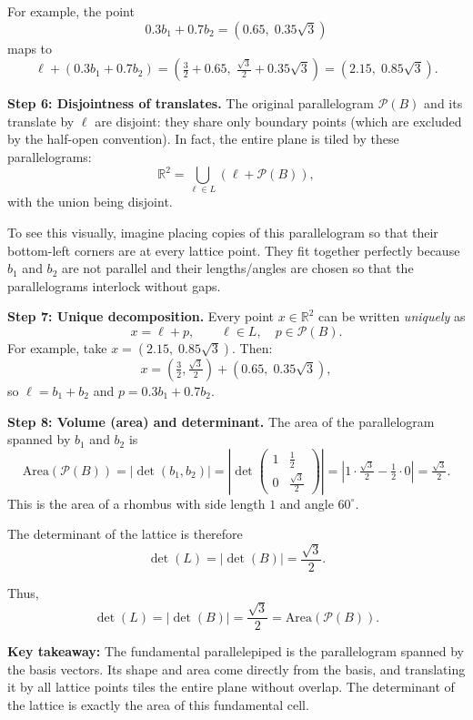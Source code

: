 For example, the point
\[
0.3b_1 + 0.7b_2 = (0.65,\; 0.35\sqrt{3})
\]
maps to
\[
\ell + (0.3b_1+0.7b_2)
= \left(\tfrac32 + 0.65,\; \tfrac{\sqrt{3}}{2} + 0.35\sqrt{3}\right)
= (2.15,\; 0.85\sqrt{3}).
\]

\medskip
\noindent
\textbf{Step 6: Disjointness of translates.}
The original parallelogram $\mathcal{P}(B)$ and its translate by $\ell$ are disjoint: they share only boundary points (which are excluded by the half-open convention). In fact, the entire plane is tiled by these parallelograms:
\[
\mathbb{R}^2 = \bigcup_{\ell \in L} (\ell + \mathcal{P}(B)),
\]
with the union being disjoint.

To see this visually, imagine placing copies of this parallelogram so that their bottom-left corners are at every lattice point. They fit together perfectly because $b_1$ and $b_2$ are not parallel and their lengths/angles are chosen so that the parallelograms interlock without gaps.

\medskip
\noindent
\textbf{Step 7: Unique decomposition.}
Every point $x \in \mathbb{R}^2$ can be written \emph{uniquely} as
\[
x = \ell + p,
\qquad
\ell \in L,\quad p \in \mathcal{P}(B).
\]
For example, take $x = (2.15,\; 0.85\sqrt{3})$. Then:
\[
x = \left(\tfrac32, \tfrac{\sqrt{3}}{2}\right) + (0.65,\; 0.35\sqrt{3}),
\]
so $\ell = b_1 + b_2$ and $p = 0.3b_1 + 0.7b_2$.

\medskip
\noindent
\textbf{Step 8: Volume (area) and determinant.}
The area of the parallelogram spanned by $b_1$ and $b_2$ is
\[
\text{Area}(\mathcal{P}(B)) = |\det(b_1, b_2)|
= \left| \det \begin{pmatrix} 1 & \tfrac12 \\ 0 & \tfrac{\sqrt{3}}{2} \end{pmatrix} \right|
= \left| 1 \cdot \tfrac{\sqrt{3}}{2} - \tfrac12 \cdot 0 \right|
= \tfrac{\sqrt{3}}{2}.
\]
This is the area of a rhombus with side length $1$ and angle $60^\circ$.

The determinant of the lattice is therefore
\[
\det(L) = |\det(B)| = \frac{\sqrt{3}}{2}.
\]

\medskip
\noindent
Thus,
\[
\boxed{\det(L) = |\det(B)| = \frac{\sqrt{3}}{2} = \text{Area}(\mathcal{P}(B)).}
\]

\medskip
\noindent
\textbf{Key takeaway:} The fundamental parallelepiped is the parallelogram spanned by the basis vectors. Its shape and area come directly from the basis, and translating it by all lattice points tiles the entire plane without overlap. The determinant of the lattice is exactly the area of this fundamental cell.


